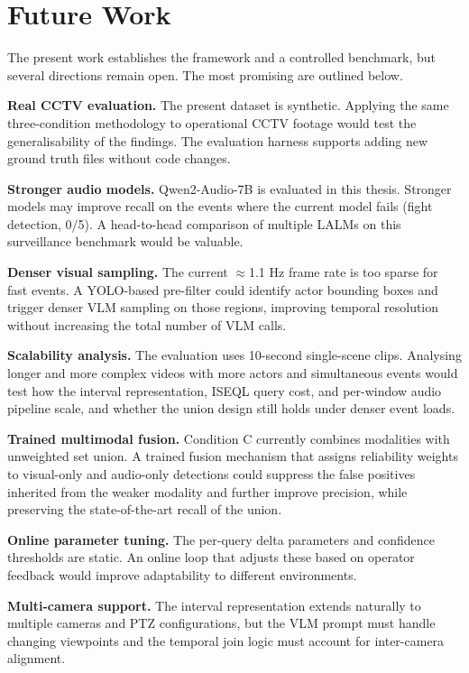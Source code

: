 \section{Future Work}

The present work establishes the framework and a controlled benchmark, but several directions remain open. The most promising are outlined below.

\textbf{Real CCTV evaluation.} The present dataset is synthetic. Applying the same three-condition methodology to operational CCTV footage would test the generalisability of the findings. The evaluation harness supports adding new ground truth files without code changes.

\textbf{Stronger audio models.} Qwen2-Audio-7B is evaluated in this thesis. Stronger models may improve recall on the events where the current model fails (fight detection, 0/5). A head-to-head comparison of multiple LALMs on this surveillance benchmark would be valuable.

\textbf{Denser visual sampling.} The current $\approx$1.1 Hz frame rate is too sparse for fast events. A YOLO-based pre-filter \citep{redmon2016yolo} could identify actor bounding boxes and trigger denser VLM sampling on those regions, improving temporal resolution without increasing the total number of VLM calls.

\textbf{Scalability analysis.} The evaluation uses 10-second single-scene clips. Analysing longer and more complex videos with more actors and simultaneous events would test how the interval representation, ISEQL query cost, and per-window audio pipeline scale, and whether the union design still holds under denser event loads.

\textbf{Trained multimodal fusion.} Condition C currently combines modalities with unweighted set union. A trained fusion mechanism that assigns reliability weights to visual-only and audio-only detections could suppress the false positives inherited from the weaker modality and further improve precision, while preserving the state-of-the-art recall of the union.

\textbf{Online parameter tuning.} The per-query delta parameters and confidence thresholds are static. An online loop that adjusts these based on operator feedback would improve adaptability to different environments.

\textbf{Multi-camera support.} The interval representation extends naturally to multiple cameras and PTZ configurations, but the VLM prompt must handle changing viewpoints and the temporal join logic must account for inter-camera alignment.
